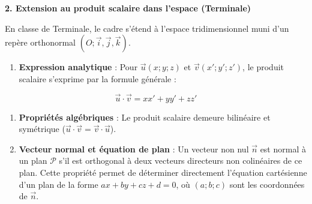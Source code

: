 \documentclass[11pt,a4paper]{article}
\begin{document}
\vspace{0.35cm}\noindent\textbf{\large 2. Extension au produit scalaire dans l'espace (Terminale)}\par\vspace{0.15cm}
En classe de Terminale, le cadre s'étend à l'espace tridimensionnel muni d'un repère orthonormal $(O ; \vec{i}, \vec{j}, \vec{k})$.
\begin{enumerate}
  \item \textbf{Expression analytique} : Pour $\vec{u}(x ; y ; z)$ et $\vec{v}(x' ; y' ; z')$, le produit scalaire s'exprime par la formule générale :
\end{enumerate}
$$\vec{u} \cdot \vec{v} = xx' + yy' + zz'$$
\begin{enumerate}
  \item \textbf{Propriétés algébriques} : Le produit scalaire demeure bilinéaire et symétrique ($\vec{u} \cdot \vec{v} = \vec{v} \cdot \vec{u}$).
  \item \textbf{Vecteur normal et équation de plan} : Un vecteur non nul $\vec{n}$ est normal à un plan $\mathcal{P}$ s'il est orthogonal à deux vecteurs directeurs non colinéaires de ce plan. Cette propriété permet de déterminer directement l'équation cartésienne d'un plan de la forme $ax + by + cz + d = 0$, où $(a ; b ; c)$ sont les coordonnées de $\vec{n}$.
\end{enumerate}
\end{document}
